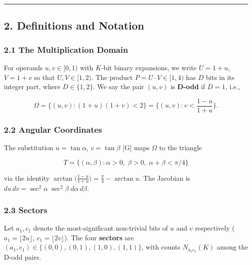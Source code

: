 \documentclass[
  11pt,
]{article}
\begin{document}
\begin{center}\rule{0.5\linewidth}{0.5pt}\end{center}

\newpage

\subsection{2. Definitions and Notation}\label{definitions-and-notation}

\subsubsection{2.1 The Multiplication Domain}\label{the-multiplication-domain}

For operands \(u, v \in [0, 1)\) with \(K\)-bit binary expansions, we write
\(U = 1 + u\), \(V = 1 + v\) so that \(U, V \in [1, 2)\). The product
\(P = U \cdot V \in [1, 4)\) has \(D\) bits in its integer part, where
\(D \in \lbrace{}1, 2\rbrace{}\). We say the pair \((u, v)\) is \textbf{D-odd}
if \(D = 1\), i.e.,

\[\Omega = \lbrace{}(u, v) : (1 + u)(1 + v) < 2\rbrace{} = \bigl\lbrace{}(u, v) : v < \frac{1 - u}{1 + u}\bigr\rbrace{}.\]

\subsubsection{2.2 Angular Coordinates}\label{angular-coordinates}

The substitution \(u = \tan\alpha\), \(v = \tan\beta\) {[}G{]} maps \(\Omega\)
to the triangle

\[T = \lbrace{}(\alpha, \beta) : \alpha > 0,\; \beta > 0,\; \alpha + \beta < \pi/4\rbrace{}\]

via the identity
\(\arctan\!\bigl(\tfrac{1-u}{1+u}\bigr) = \tfrac{\pi}{4} - \arctan u\). The
Jacobian is \(du\,dv = \sec^2\!\alpha\;\sec^2\!\beta\;d\alpha\,d\beta\).

\subsubsection{2.3 Sectors}\label{sectors}

Let \(a_1, c_1\) denote the most-significant non-trivial bits of \(u\) and \(v\)
respectively (\(a_1 = \lfloor 2u \rfloor\), \(c_1 = \lfloor 2v \rfloor\)). The
four \textbf{sectors} are
\((a_1, c_1) \in \lbrace{}(0,0), (0,1), (1,0), (1,1)\rbrace{}\), with counts
\(N_{a_1 c_1}(K)\) among the D-odd pairs.
\end{document}
